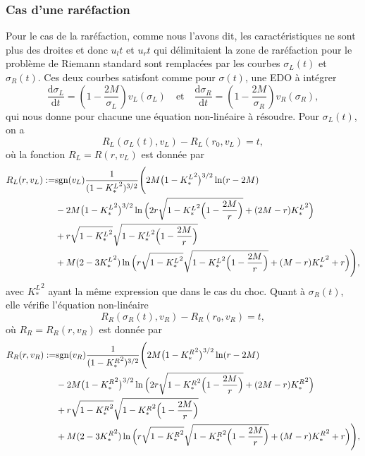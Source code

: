 \documentclass[11pt,a4paper]{article}
\begin{document}
\subsubsection{Cas d'une raréfaction}

Pour le cas de la raréfaction, comme nous l'avons dit, les caractéristiques ne sont plus des droites et donc $u_l t$ et $u_r t$ qui délimitaient la zone de raréfaction pour le problème de Riemann standard sont remplacées par les courbes $\sigma_L(t)$ et $\sigma_R(t)$.
Ces deux courbes satisfont comme pour $\sigma(t)$, une EDO à intégrer
\begin{equation}
	\frac{\mathrm{d}\sigma_L}{\mathrm{d}t} = \left(1 - \frac{2M}{\sigma_L}\right) v_L(\sigma_L)\quad \text{et} \quad \frac{\mathrm{d}\sigma_R}{\mathrm{d}t} = \left(1 - \frac{2M}{\sigma_R}\right) v_R(\sigma_R),
\end{equation}
qui nous donne pour chacune une équation non-linéaire à résoudre. Pour $\sigma_L (t)$, on a 
\begin{equation}
R_L(\sigma_L (t), v_L)- R_L(r_0, v_L)= t, 
\end{equation}	
où la fonction $R_L= R(r, v_L )$ est donnée par
\begin{equation}\label{speed-1}
\aligned 
 R_L (r, v_L) : = & \text{sgn}(v_L)\frac{1}{(1 - {K_*^L}^2 )^{3/2}} 
\Bigg (  2 M \big({1}  - {K_*^L}^2\big)^{3/2} \ln (r- 2M )
\\  
& -2M  \big({1}  - {K_*^L}^2\big)^{3/2} \ln \Big( {2 r}  \sqrt {{1}- {K_*^L}^2 \Big(1- {2M\over r}\Big)} +( 2M-r) {K_*^L}^2\Big )
\\
& 
+ r \sqrt {{1}  -{K_*^L}^2}   \sqrt {{1}- {K_*^L}^2\Big(1- {2M\over r}\Big) } 
\\
& + M(2 -3 {K_*^L}^2 ) \ln \Big( r \sqrt {{1}- {K_*^L}^2}   \sqrt {{1}- {K_*^L}^2 \Big(1- {2M\over r}\Big)  } + ( M-r) {K_*^L}^2+{ r}  \Big )
 \Bigg), 
 \endaligned 
\end{equation}
avec ${K_*^L}^2$ ayant la même expression que dans le cas du choc. 
Quant à $\sigma_R(t)$, elle vérifie l'équation non-linéaire
\begin{equation}
R_R(\sigma_R (t), v_R)- R_R(r_0, v_R)= t, 
\end{equation}
où $R_R = R_R(r, v_R)$ est donnée par
\begin{equation}
\aligned 
 R_R (r, v_R) : = & \text{sgn}(v_R)\frac{1}{(1 - {K_*^R}^2 )^{3/2}} 
\Bigg (  2 M \big({1}  - {K_*^R}^2\big)^{3/2} \ln (r- 2M )
\\  
& -2M  \big({1}  - {K_*^R}^2\big)^{3/2} \ln \Big( {2 r}  \sqrt {{1}- {K_*^R}^2 \Big(1- {2M\over r}\Big)} +( 2M-r) {K_*^R}^2\Big )
\\
& 
+ r \sqrt {{1}  -{K_*^R}^2}   \sqrt {{1}- {K_*^R}^2\Big(1- {2M\over r}\Big) } 
\\
& + M(2 -3 {K_*^R}^2 ) \ln \Big( r \sqrt {{1}- {K_*^R}^2}   \sqrt {{1}- {K_*^R}^2 \Big(1- {2M\over r}\Big)  } + ( M-r) {K_*^R}^2+{ r}  \Big )
 \Bigg), 
 \endaligned 
\end{equation}
\end{document}
